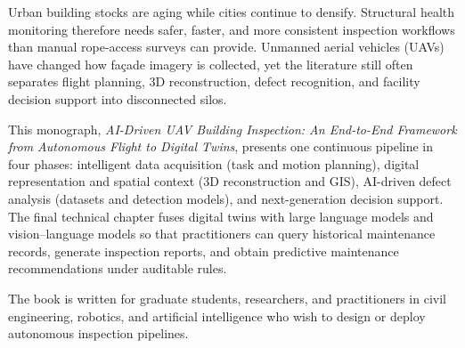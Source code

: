 \preface

Urban building stocks are aging while cities continue to densify. Structural
health monitoring therefore needs safer, faster, and more consistent inspection
workflows than manual rope-access surveys can provide. Unmanned aerial vehicles
(UAVs) have changed how fa\c{c}ade imagery is collected, yet the literature still
often separates flight planning, 3D reconstruction, defect recognition, and
facility decision support into disconnected silos.

This monograph, \emph{AI-Driven UAV Building Inspection: An End-to-End Framework
from Autonomous Flight to Digital Twins}, presents one continuous pipeline in four
phases: intelligent data acquisition (task and motion planning), digital
representation and spatial context (3D reconstruction and GIS), AI-driven defect
analysis (datasets and detection models), and next-generation decision support.
The final technical chapter fuses digital twins with large language models and
vision--language models so that practitioners can query historical maintenance
records, generate inspection reports, and obtain predictive maintenance
recommendations under auditable rules.

The book is written for graduate students, researchers, and practitioners in
civil engineering, robotics, and artificial intelligence who wish to design or
deploy autonomous inspection pipelines.
